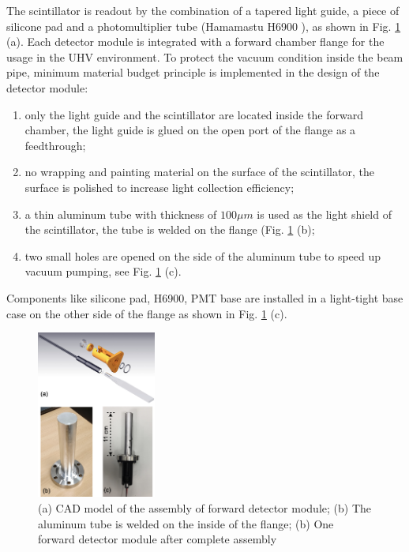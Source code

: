 \documentclass[number,5p]{elsarticle}
\begin{document}
The scintillator is readout by the combination of a tapered light guide, a piece of silicone pad and a
photomultiplier tube (Hamamastu H6900 \cite{hamamatsu}), as shown in Fig. \ref{fig:forward_module} (a).
Each detector module is integrated with a forward chamber flange for the usage
in the UHV environment.
To protect the vacuum condition inside the beam pipe, minimum material budget principle is implemented in the design of the detector module:
\begin{enumerate}
\item only the light guide and the scintillator are located inside the forward chamber, the light guide is glued on the open port of the flange as a feedthrough;
\item no wrapping and painting material on the surface of the scintillator, the surface is polished to increase light collection efficiency;
\item a thin aluminum tube with thickness of \(100 \mu m\) is used as the light shield of the scintillator, the tube is welded on the flange (Fig. \ref{fig:forward_module} (b);
\item two small holes are opened on the side of the aluminum tube to speed up vacuum pumping, see Fig. \ref{fig:forward_module} (c).
\end{enumerate}
Components like silicone pad, H6900, PMT base are installed in a light-tight base case on the other side of the flange as shown in Fig. \ref{fig:forward_module} (c).

\begin{figure}[htbp]
\centering
\includegraphics[width=0.35\textwidth]{./forward_module.png}
\caption{(a) CAD model of the assembly of forward detector module; (b) The aluminum tube is welded on the inside of the flange; (b) One forward detector module after complete assembly}
\label{fig:forward_module}
\end{figure}
\end{document}
